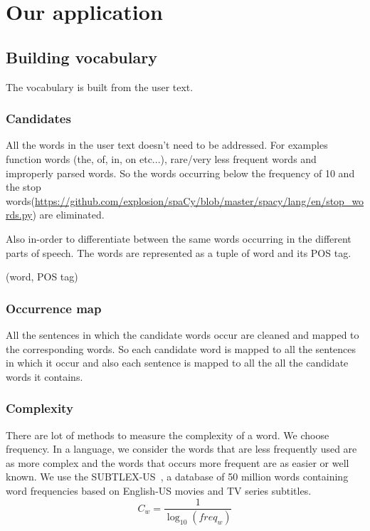 \documentclass[11pt,a4paper]{article}
\begin{document}
\section{Our application}

\subsection{Building vocabulary}
The vocabulary is built from the user text.

\subsubsection{Candidates}
All the words in the user text doesn't need to be addressed. For examples 
function words (the, of, in, on etc...), rare/very less frequent words and
improperly parsed words. So the words occurring below the frequency of 10 and
the stop words(\url{https://github.com/explosion/spaCy/blob/master/spacy/lang/en/stop_words.py}) are eliminated. 

Also in-order to differentiate between the same words occurring in the
different parts of speech. The words are represented as a tuple of word and its
POS tag.
\begin{center}(word, POS tag)\end{center}

\subsubsection{Occurrence map}
All the sentences in which the candidate words occur are cleaned and mapped to
the corresponding words. So each candidate word is mapped to all the sentences
in which it occur and also each sentence is mapped to all the all the candidate
words it contains.

\subsubsection{Complexity}
There are lot of methods to measure the complexity of a word. We choose frequency.
In a language, we consider the words that are less frequently used are as
more complex and the words that occurs more frequent are as easier or well known.
We use the SUBTLEX-US~\cite{brysbaert2009moving}, a database of 50 million
words containing word frequencies based on English-US movies and TV series subtitles.
\begin{equation}
  C_w = \frac{1}{\log_{10}(freq_w)}
\end{equation}
\end{document}
